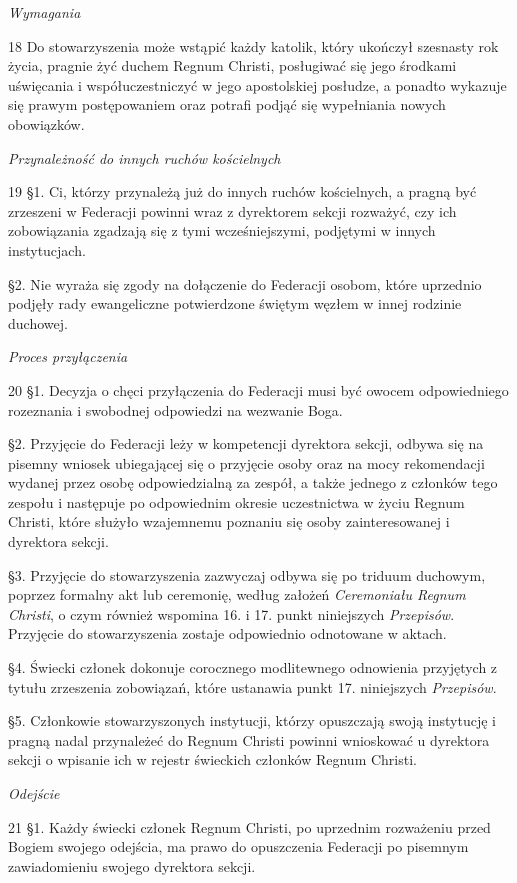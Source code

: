 ﻿\documentclass{report}
\newcommand{\lett}[1]{\lettrine[findent=6pt]{#1}{}}
\newcommand{\ssec}[1]{\vspace{1em}\textit{#1}\vspace{.5em}\nopagebreak}
\begin{document}
\ssec{Wymagania}


\lett{18} Do stowarzyszenia może wstąpić każdy katolik, który ukończył szesnasty rok życia, pragnie żyć duchem Regnum Christi, posługiwać się jego środkami uświęcania i współuczestniczyć w jego apostolskiej posłudze, a ponadto wykazuje się prawym postępowaniem oraz potrafi podjąć się wypełniania nowych obowiązków.


\ssec{Przynależność do innych ruchów kościelnych}


\lett{19} \S{}1. Ci, którzy przynależą już do innych ruchów kościelnych, a pragną być zrzeszeni w Federacji powinni wraz z dyrektorem sekcji rozważyć, czy ich zobowiązania zgadzają się z tymi wcześniejszymi, podjętymi w innych instytucjach.


\S{}2. Nie wyraża się zgody na dołączenie do Federacji osobom, które uprzednio podjęły rady ewangeliczne potwierdzone świętym węzłem w innej rodzinie duchowej.


\ssec{Proces przyłączenia}


\lett{20} \S{}1. Decyzja o chęci przyłączenia do Federacji musi być owocem odpowiedniego rozeznania i swobodnej odpowiedzi na wezwanie Boga.


\S{}2. Przyjęcie do Federacji leży w kompetencji dyrektora sekcji, odbywa się na pisemny wniosek ubiegającej się o przyjęcie osoby oraz na mocy rekomendacji wydanej przez osobę odpowiedzialną  za zespół, a także jednego z członków tego zespołu i następuje po odpowiednim okresie uczestnictwa w życiu Regnum Christi, które służyło wzajemnemu poznaniu się osoby zainteresowanej i dyrektora sekcji.


\S{}3. Przyjęcie do stowarzyszenia zazwyczaj odbywa się po triduum duchowym, poprzez formalny akt lub ceremonię, według założeń {\em Ceremoniału Regnum Christi}, o czym również wspomina 16. i 17. punkt niniejszych {\em Przepisów}. Przyjęcie do stowarzyszenia zostaje odpowiednio odnotowane w aktach.


\S{}4. Świecki członek dokonuje corocznego modlitewnego odnowienia przyjętych z tytułu zrzeszenia zobowiązań, które ustanawia punkt 17. niniejszych {\em Przepisów}.


\S{}5. Członkowie stowarzyszonych instytucji, którzy opuszczają swoją instytucję i pragną nadal przynależeć do Regnum Christi powinni wnioskować u dyrektora sekcji o wpisanie ich w rejestr świeckich członków Regnum Christi.
 
\ssec{Odejście}


\lett{21} \S{}1. Każdy świecki członek Regnum Christi, po uprzednim rozważeniu przed Bogiem swojego odejścia, ma prawo do opuszczenia Federacji po pisemnym zawiadomieniu swojego dyrektora sekcji.
\end{document}
